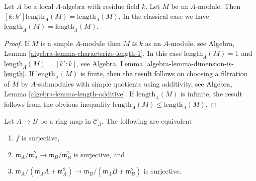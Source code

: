 \begin{lemma}
\label{lemma-length}
Let $A$ be a local $\Lambda$-algebra with residue field $k$.
Let $M$ be an $A$-module. Then
$[k : k'] \text{length}_A(M) = \text{length}_\Lambda(M)$.
In the classical case we have
$\text{length}_A(M) = \text{length}_\Lambda(M)$.
\end{lemma}

\begin{proof}
If $M$ is a simple $A$-module then $M \cong k$ as an $A$-module, see
Algebra, Lemma \ref{algebra-lemma-characterize-length-1}.
In this case $\text{length}_A(M) = 1$ and
$\text{length}_\Lambda(M) = [k' : k]$, see
Algebra, Lemma \ref{algebra-lemma-dimension-is-length}.
If $\text{length}_A(M)$ is finite, then the result follows on
choosing a filtration of $M$ by $A$-submodules with simple quotients
using additivity, see
Algebra, Lemma \ref{algebra-lemma-length-additive}.
If $\text{length}_A(M)$ is infinite, the result follows from the obvious
inequality $\text{length}_A(M) \leq \text{length}_\Lambda(M)$.
\end{proof}

\begin{lemma}
\label{lemma-surjective}
Let $A \to B$ be a ring map in $\mathcal{C}_\Lambda$.
The following are equivalent
\begin{enumerate}
\item $f$ is surjective,
\item $\mathfrak m_A/\mathfrak m_A^2 \to \mathfrak m_B/\mathfrak m_B^2$
is surjective, and
\item $\mathfrak m_A/(\mathfrak m_\Lambda A + \mathfrak m_A^2)
\to \mathfrak m_B/(\mathfrak m_\Lambda B + \mathfrak m_B^2)$ is surjective.
\end{enumerate}
\end{lemma}

